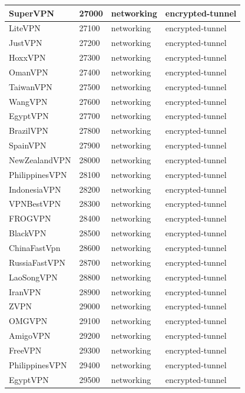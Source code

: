 \begin{longtable}{p{}|p{}|p{}|p{}}
    SuperVPN &	27000 &	networking &	encrypted-tunnel \\ \hline
    LiteVPN &	27100 &	networking &	encrypted-tunnel \\ \hline
    JustVPN &	27200 &	networking &	encrypted-tunnel \\ \hline
    HoxxVPN &	27300 &	networking &	encrypted-tunnel \\ \hline
    OmanVPN &	27400 &	networking &	encrypted-tunnel \\ \hline
    TaiwanVPN &	27500 &	networking &	encrypted-tunnel \\ \hline
    WangVPN &	27600 &	networking &	encrypted-tunnel \\ \hline
    EgyptVPN &	27700 &	networking &	encrypted-tunnel \\ \hline
    BrazilVPN &	27800 &	networking &	encrypted-tunnel \\ \hline
    SpainVPN &	27900 &	networking &	encrypted-tunnel \\ \hline
    NewZealandVPN &	28000 &	networking &	encrypted-tunnel \\ \hline
    PhilippinesVPN &	28100 &	networking &	encrypted-tunnel \\ \hline
    IndonesiaVPN &	28200 &	networking &	encrypted-tunnel \\ \hline
    VPNBestVPN &	28300 &	networking &	encrypted-tunnel \\ \hline
    FROGVPN &	28400 &	networking &	encrypted-tunnel \\ \hline
    BlackVPN &	28500 &	networking &	encrypted-tunnel \\ \hline
    ChinaFastVpn &	28600 &	networking &	encrypted-tunnel \\ \hline
    RussiaFastVPN &	28700 &	networking &	encrypted-tunnel \\ \hline
    LaoSongVPN &	28800 &	networking &	encrypted-tunnel \\ \hline
    IranVPN &	28900 &	networking &	encrypted-tunnel \\ \hline
    ZVPN &	29000 &	networking &	encrypted-tunnel \\ \hline
    OMGVPN &	29100 &	networking &	encrypted-tunnel \\ \hline
    AmigoVPN &	29200 &	networking &	encrypted-tunnel \\ \hline
    FreeVPN &	29300 &	networking &	encrypted-tunnel \\ \hline
    PhilippinesVPN &	29400 &	networking &	encrypted-tunnel \\ \hline
    EgyptVPN &	29500 &	networking &	encrypted-tunnel \\ \hline

\end{longtable}
